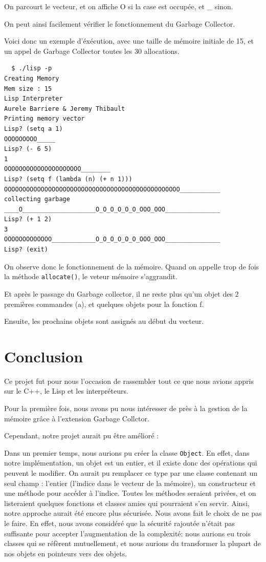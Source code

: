 \documentclass[12pt]{article}
\def\code #1{\lstinline{#1}}
\begin{document}
On parcourt le vecteur, et on affiche O si la case est occupée, et \_ sinon.

On peut ainsi facilement vérifier le fonctionnement du Garbage Collector.

Voici donc un exemple d'éxécution, avec une taille de mémoire initiale de 15, et un appel de Garbage Collector toutes les 30 allocations.

\lstset{language=C++,basicstyle=\ttfamily,breaklines=true, frame=single}
\begin{lstlisting}
  $ ./lisp -p
Creating Memory
Mem size : 15
Lisp Interpreter
Aurele Barriere & Jeremy Thibault
Printing memory vector
Lisp? (setq a 1)
OOOOOOOOO_____
Lisp? (- 6 5)
1
OOOOOOOOOOOOOOOOOOOOO________
Lisp? (setq f (lambda (n) (+ n 1)))
OOOOOOOOOOOOOOOOOOOOOOOOOOOOOOOOOOOOOOOOOOOOOOOO___________
collecting garbage
____O____________________O_O_O_O_O_O_OOO_OOO_______________
Lisp? (+ 1 2)
3
OOOOOOOOOOOOO____________O_O_O_O_O_O_OOO_OOO_______________
Lisp? (exit)
\end{lstlisting}
\lstset{language=C++,basicstyle=\ttfamily,breaklines=true}

On observe donc le fonctionnement de la mémoire. Quand on appelle trop de fois la méthode \code{allocate()}, le veteur mémoire s'aggrandit.

Et après le passage du Garbage collector, il ne reste plus qu'un objet des 2 premières commandes (a), et quelques objets pour la fonction f.

Ensuite, les prochains objets sont assignés au début du vecteur.

\section{Conclusion}

Ce projet fut pour nous l'occasion de rassembler tout ce que nous avions appris sur le C++, le Lisp et les interpréteurs.

Pour la première fois, nous avons pu nous intéresser de près à la gestion de la mémoire grâce à l'extension Garbage Collctor.


Cependant, notre projet aurait pu être amélioré :

Dans un premier temps, nous aurions pu créer la classe \code{Object}.
En effet, dans notre implémentation, un objet est un entier, et il existe donc des opérations qui peuvent le modifier. On aurait pu remplacer ce type par une classe contenant un seul champ : l'entier (l'indice dans le vecteur de la mémoire), un constructeur et une méthode pour accéder à l'indice. Toutes les méthodes seraient privées, et on listeraient quelques fonctions et classes amies qui pourraient s'en servir. Ainsi, notre approche aurait été encore plus sécurisée.
Nous avons fait le choix de ne pas le faire. En effet, nous avons considéré que la sécurité rajoutée n'était pas suffisante pour accepter l'augmentation de la complexité: nous aurions eu trois classes qui se réfèrent mutuellement, et nous aurions du transformer la plupart de nos objets en pointeurs vers des objets.
\end{document}
